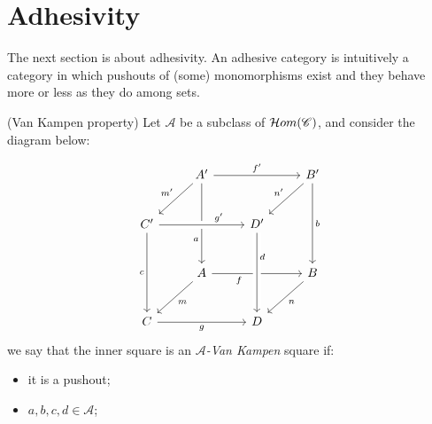 \section{Adhesivity}\label{sect:adh}

The next section is about adhesivity.
An adhesive category is intuitively a category in which pushouts of (some) monomorphisms exist and they behave more or less as they do among sets. 

\begin{definition}(Van Kampen property)
    Let $\mathcal A$ be a subclass of $\mathcal{H}om(\mathscr{C})$, and consider the diagram below:
	\iffalse
    \[
    \begin{tikzcd}[row sep = scriptsize]
        A' \arrow[ddd, "m'"swap] \arrow[rrr, "f'"] \arrow[dr, "a"swap] & & & B \arrow[ddd, "n'"] \arrow[dl, "b"] \\
        & A \arrow[r, "f"] \arrow[d, "m" swap] & B \arrow[d, "n"]   & \\
        & C \arrow[r, "g" swap]                & D                  & \\
        C' \arrow[rrr, "g'"swap] \arrow[ur, "c"] & & & D' \arrow[ul, "d" swap] 
    \end{tikzcd}
    \]
	\fi
    \[\begin{tikzcd}[row sep=25, column sep=25]
	& {A'} && {B'} \\
	{C'} && {D'} \\
	& A && B \\
	C && D
	\arrow["{f'}", from=1-2, to=1-4]
	\arrow["{m'}"', from=1-2, to=2-1]
	\arrow["a"'{pos=0.7}, from=1-2, to=3-2]
	\arrow["{n'}"', from=1-4, to=2-3]
	\arrow["b", from=1-4, to=3-4]
	\arrow["{g'}"{pos=0.7}, from=2-1, to=2-3, crossing over]
	\arrow["c"', from=2-1, to=4-1]
	\arrow["f"'{pos=0.3}, from=3-2, to=3-4]
	\arrow["d"{pos=0.3}, from=2-3, to=4-3, crossing over]
	\arrow["m", from=3-2, to=4-1]
	\arrow["n", from=3-4, to=4-3]
	\arrow["g"', from=4-1, to=4-3]
    \end{tikzcd}\]
    we say that the inner square is an \emph{$\mathcal A$-Van Kampen} square if:
    \begin{itemize}
        \item it is a pushout;
        \item $a, b, c, d \in \mathcal{A}$;

\end{itemize}
\end{definition}
